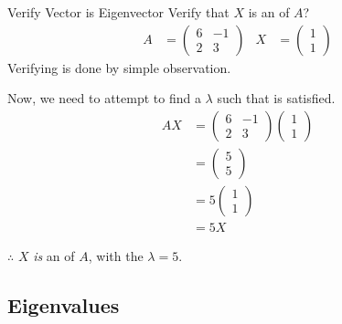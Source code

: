 \begin{example}{Verify Vector is Eigenvector}
  Verify that $X$ is an  of $A$?
  \begin{align*}
    A &=
        \begin{pmatrix}
          6 & -1 \\
          2 & 3
        \end{pmatrix} &
                        X &=
                            \begin{pmatrix}
                              1 \\
                              1
                            \end{pmatrix}
  \end{align*}
  \tcblower{}
  Verifying  is done by simple observation.

  Now, we need to attempt to find a $\lambda$ such that  is satisfied.
  \begin{align*}
    AX &=
         \begin{pmatrix}
           6 & -1 \\
           2 & 3
         \end{pmatrix}
               \begin{pmatrix}
                 1 \\
                 1
               \end{pmatrix} \\
    &=
      \begin{pmatrix}
        5 \\
        5
      \end{pmatrix} \\
    &= 5
      \begin{pmatrix}
        1 \\
        1
      \end{pmatrix} \\
    &= 5 X
  \end{align*}

  $\therefore$ $X$ \textit{is} an  of $A$, with the  $\lambda = 5$.
\end{example}


\subsection{Eigenvalues}\label{subsec:Eigenvalues}

